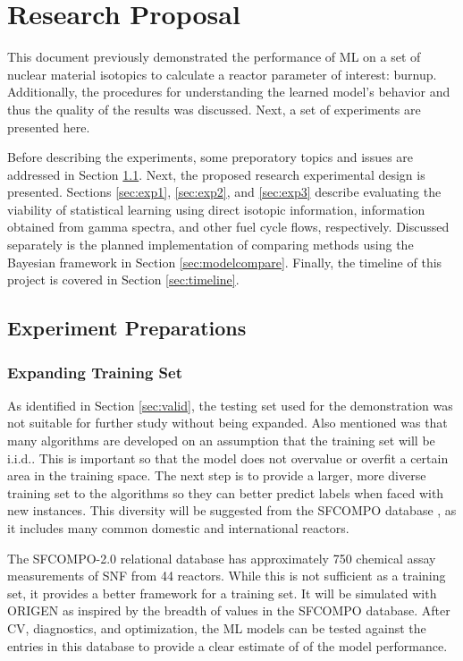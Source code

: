 \chapter{Research Proposal}
\label{ch:proposal}

This document previously demonstrated the performance of \gls{ML} on a
set of nuclear material isotopics to calculate a reactor parameter of interest:
burnup.  Additionally, the procedures for understanding the learned model's
behavior and thus the quality of the results was discussed.  Next, a set of
experiments are presented here. 

Before describing the experiments, some preporatory topics and issues are
addressed in Section \ref{sec:prep}.  Next, the proposed research experimental
design is presented. Sections \ref{sec:exp1}, \ref{sec:exp2}, and
\ref{sec:exp3} describe evaluating the viability of statistical learning using
direct isotopic information, information obtained from gamma spectra, and other
fuel cycle flows, respectively.  Discussed separately is the planned
implementation of comparing methods using the Bayesian framework in Section
\ref{sec:modelcompare}. Finally, the timeline of this project is covered in
Section \ref{sec:timeline}.

\section{Experiment Preparations}
\label{sec:prep}

\subsection*{Expanding Training Set}

As identified in Section \ref{sec:valid}, the testing set used for the
demonstration was not suitable for further study without being expanded. Also
mentioned was that many algorithms are developed on an assumption that the
training set will be \acrfull{i.i.d.}.  This is important so that the model
does not overvalue or overfit a certain area in the training space.  The next
step is to provide a larger, more diverse training set to the algorithms so
they can better predict labels when faced with new instances. This diversity
will be suggested from the \gls{SFCOMPO} database \cite{sfcompo}, as it
includes many common domestic and international reactors.

The SFCOMPO-2.0 relational database \cite{sfcompo} has approximately 750
chemical assay measurements of \gls{SNF} from 44 reactors. While this is not
sufficient as a training set, it provides a better framework for a training
set. It will be simulated with \gls{ORIGEN} as inspired by the breadth of
values in the \gls{SFCOMPO} database. After \acrfull{CV}, diagnostics, and
optimization, the \gls{ML} models can be tested against the entries in this
database to provide a clear estimate of of the model performance. 

